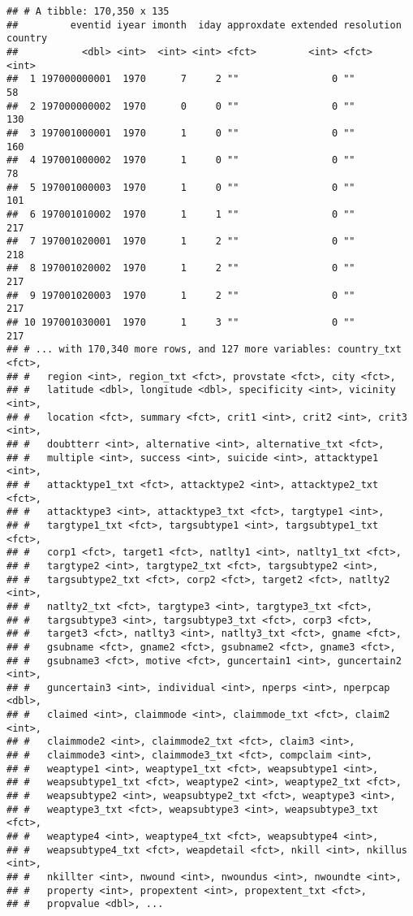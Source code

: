\documentclass[11pt,letterpaper,]{article}
\theoremstyle{definition}
\theoremstyle{definition}
\theoremstyle{definition}
\theoremstyle{remark}
\begin{document}
\begin{verbatim}
## # A tibble: 170,350 x 135
##         eventid iyear imonth  iday approxdate extended resolution country
##           <dbl> <int>  <int> <int> <fct>         <int> <fct>        <int>
##  1 197000000001  1970      7     2 ""                0 ""              58
##  2 197000000002  1970      0     0 ""                0 ""             130
##  3 197001000001  1970      1     0 ""                0 ""             160
##  4 197001000002  1970      1     0 ""                0 ""              78
##  5 197001000003  1970      1     0 ""                0 ""             101
##  6 197001010002  1970      1     1 ""                0 ""             217
##  7 197001020001  1970      1     2 ""                0 ""             218
##  8 197001020002  1970      1     2 ""                0 ""             217
##  9 197001020003  1970      1     2 ""                0 ""             217
## 10 197001030001  1970      1     3 ""                0 ""             217
## # ... with 170,340 more rows, and 127 more variables: country_txt <fct>,
## #   region <int>, region_txt <fct>, provstate <fct>, city <fct>,
## #   latitude <dbl>, longitude <dbl>, specificity <int>, vicinity <int>,
## #   location <fct>, summary <fct>, crit1 <int>, crit2 <int>, crit3 <int>,
## #   doubtterr <int>, alternative <int>, alternative_txt <fct>,
## #   multiple <int>, success <int>, suicide <int>, attacktype1 <int>,
## #   attacktype1_txt <fct>, attacktype2 <int>, attacktype2_txt <fct>,
## #   attacktype3 <int>, attacktype3_txt <fct>, targtype1 <int>,
## #   targtype1_txt <fct>, targsubtype1 <int>, targsubtype1_txt <fct>,
## #   corp1 <fct>, target1 <fct>, natlty1 <int>, natlty1_txt <fct>,
## #   targtype2 <int>, targtype2_txt <fct>, targsubtype2 <int>,
## #   targsubtype2_txt <fct>, corp2 <fct>, target2 <fct>, natlty2 <int>,
## #   natlty2_txt <fct>, targtype3 <int>, targtype3_txt <fct>,
## #   targsubtype3 <int>, targsubtype3_txt <fct>, corp3 <fct>,
## #   target3 <fct>, natlty3 <int>, natlty3_txt <fct>, gname <fct>,
## #   gsubname <fct>, gname2 <fct>, gsubname2 <fct>, gname3 <fct>,
## #   gsubname3 <fct>, motive <fct>, guncertain1 <int>, guncertain2 <int>,
## #   guncertain3 <int>, individual <int>, nperps <int>, nperpcap <dbl>,
## #   claimed <int>, claimmode <int>, claimmode_txt <fct>, claim2 <int>,
## #   claimmode2 <int>, claimmode2_txt <fct>, claim3 <int>,
## #   claimmode3 <int>, claimmode3_txt <fct>, compclaim <int>,
## #   weaptype1 <int>, weaptype1_txt <fct>, weapsubtype1 <int>,
## #   weapsubtype1_txt <fct>, weaptype2 <int>, weaptype2_txt <fct>,
## #   weapsubtype2 <int>, weapsubtype2_txt <fct>, weaptype3 <int>,
## #   weaptype3_txt <fct>, weapsubtype3 <int>, weapsubtype3_txt <fct>,
## #   weaptype4 <int>, weaptype4_txt <fct>, weapsubtype4 <int>,
## #   weapsubtype4_txt <fct>, weapdetail <fct>, nkill <int>, nkillus <int>,
## #   nkillter <int>, nwound <int>, nwoundus <int>, nwoundte <int>,
## #   property <int>, propextent <int>, propextent_txt <fct>,
## #   propvalue <dbl>, ...
\end{verbatim}
\end{document}
